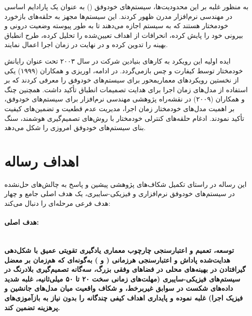 \documentclass[oneside,openany,phd]{TMU-Thesis}
\begin{document}
به منظور غلبه بر این محدودیت‌ها، سیستم‌های خودوفق () به عنوان یک پارادایم اساسی در مهندسی نرم‌افزار مدرن ظهور کردند. این سیستم‌ها مجهز به حلقه‌های بازخورد خودمختار هستند که به سیستم اجازه می‌دهند تا به طور پیوسته وضعیت درونی و بیرونی خود را پایش کرده، انحرافات از اهداف تعیین‌شده را تحلیل کرده، طرح انطباق بهینه را تدوین کرده و در نهایت در زمان اجرا اعمال نمایند. 

ایده اولیه این رویکرد به کارهای بنیادین شرکت  در سال ۲۰۰۳ تحت عنوان رایانش خودمختار توسط کیفارت و چس \cite{kephart2003vision} بازمی‌گردد. در ادامه، اوریزی و همکاران (۱۹۹۹) \cite{oreizy1999architecture} یکی از نخستین رویکردهای معماریمحور برای سیستم‌های خودوفق را معرفی کردند که بر استفاده از مدل‌های زمان اجرا برای هدایت تصمیمات انطباق تأکید داشت. همچنین چنگ و همکاران (۲۰۰۹) \cite{cheng2009software} در نقشه‌راه پژوهشی مهندسی نرم‌افزار برای سیستم‌های خودوفق، بر اهمیت مدل‌های خودمختار زمان اجرا، مدیریت عدم قطعیت و تضمین‌های کیفیت تأکید نمودند. ادغام حلقه‌های کنترلی خودمختار با روش‌های تصمیم‌گیری هوشمند، سنگ بنای سیستم‌های خودوفق امروزی را شکل می‌دهد.

\section{اهداف رساله}

این رساله در راستای تکمیل شکاف‌های پژوهشی پیشین \cite{cheng2009software} و پاسخ به چالش‌های حل‌نشده در سیستم‌های خودوفق نرم‌افزاری و فیزیکی-سایبری، یک هدف اصلی جامع و چهار هدف فرعی مرحله‌ای را دنبال می‌کند:

\paragraph{هدف اصلی:}\mbox{}\\
\textbf{توسعه، تعمیم و اعتبارسنجی چارچوب معماری یادگیری تقویتی عمیق با شکل‌دهی هدایت‌شده پاداش و اعتبارسنجی هرزمانی ( و \rsdrlplus) به‌گونه‌ای که هم‌زمان بر معضل گیرافتادن در بهینه‌های محلی در فضاهای وفقی بزرگ، سه‌گانه تصمیم‌گیری بلادرنگ در سیستم‌های فیزیکی-سایبری (مهلت‌های زمانی سخت ۲۰ تا ۵۰ میلی‌ثانیه، غلبه شدید داده‌های شکست در سوابق غیربرخط، و شکاف واقعیت میان مدل‌های جانشین و فیزیک اجرا) غلبه نموده و پایداری اهداف کیفی چندگانه را بدون نیاز به بازآموزی‌های پرهزینه تضمین کند.}
\end{document}
